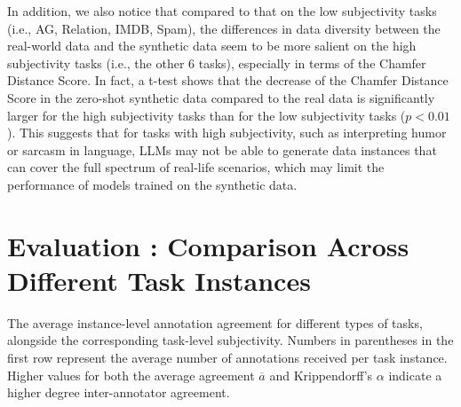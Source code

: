 In addition, we also notice that compared to that on the low subjectivity tasks (i.e., AG, Relation, IMDB, Spam), the differences in data diversity between the real-world data and the synthetic data seem to be more salient on the high subjectivity tasks (i.e., the other 6 tasks), especially in terms of the Chamfer Distance Score. In fact, a t-test shows that the decrease of the Chamfer Distance Score in the zero-shot synthetic data compared to the real data is significantly larger for the high subjectivity tasks than for the low subjectivity tasks ($p<0.01$). 
This suggests that for tasks with high subjectivity, such as interpreting humor or sarcasm in language, LLMs may not be able to 
generate data instances that can cover the full spectrum of real-life scenarios, which may limit the performance of models trained on the synthetic data. 

\section{Evaluation : Comparison Across Different Task Instances}

\begin{table*}
\centering
{}
\caption{The average instance-level annotation agreement for different types of tasks, 
alongside the corresponding task-level subjectivity. Numbers in parentheses in the first row
represent the average number of annotations received per task instance. Higher values for both the average agreement $\overline{a}$ and Krippendorff's $\alpha$ indicate a higher degree inter-annotator agreement.
}
\label{tab:hit2}
\end{table*}

